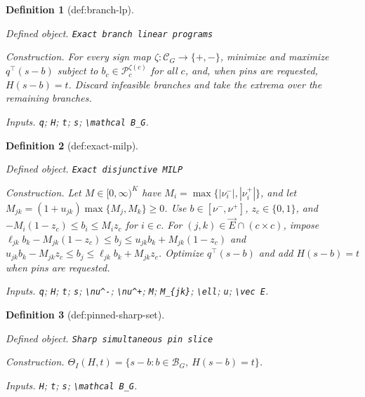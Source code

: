\documentclass{article}
\newtheorem{definition}{Definition}
\begin{document}
\begin{definition}[def:branch-lp]\label{def:branch-lp}
\par\smallskip\noindent\emph{Defined object.} \texttt{Exact branch linear programs}
\par\smallskip\noindent\emph{Construction.} For every sign map \(\zeta:\mathcal C_G\to\{+,-\}\), minimize and maximize \(q^\top(s-b)\) subject to \(b_c\in\mathcal P_c^{\zeta(c)}\) for all \(c\), and, when pins are requested, \(H(s-b)=t\). Discard infeasible branches and take the extrema over the remaining branches.
\par\smallskip\noindent\emph{Inputs.} \texttt{q}; \texttt{H}; \texttt{t}; \texttt{s}; \texttt{\textbackslash{}\allowbreak{}mathcal B\_\allowbreak{}G}.
\end{definition}

\begin{definition}[def:exact-milp]\label{def:exact-milp}
\par\smallskip\noindent\emph{Defined object.} \texttt{Exact disjunctive MILP}
\par\smallskip\noindent\emph{Construction.} Let \(M\in[0,\infty)^K\) have \(M_i=\max\{|\nu_i^-|,|\nu_i^+|\}\), and let \(M_{jk}=(1+u_{jk})\max\{M_j,M_k\}\ge0\). Use \(b\in[\nu^-,\nu^+]\), \(z_c\in\{0,1\}\), and \(-M_i(1-z_c)\le b_i\le M_i z_c\) for \(i\in c\). For \((j,k)\in\vec E\cap(c\times c)\), impose \(\ell_{jk}b_k-M_{jk}(1-z_c)\le b_j\le u_{jk}b_k+M_{jk}(1-z_c)\) and \(u_{jk}b_k-M_{jk}z_c\le b_j\le\ell_{jk}b_k+M_{jk}z_c\). Optimize \(q^\top(s-b)\) and add \(H(s-b)=t\) when pins are requested.
\par\smallskip\noindent\emph{Inputs.} \texttt{q}; \texttt{H}; \texttt{t}; \texttt{s}; \texttt{\textbackslash{}\allowbreak{}nu\textasciicircum{}-\allowbreak{}}; \texttt{\textbackslash{}\allowbreak{}nu\textasciicircum{}+\allowbreak{}}; \texttt{M}; \texttt{M\_\allowbreak{}\{jk\}\allowbreak{}}; \texttt{\textbackslash{}\allowbreak{}ell}; \texttt{u}; \texttt{\textbackslash{}\allowbreak{}vec E}.
\end{definition}

\begin{definition}[def:pinned-sharp-set]\label{def:pinned-sharp-set}
\par\smallskip\noindent\emph{Defined object.} \texttt{Sharp simultaneous pin slice}
\par\smallskip\noindent\emph{Construction.} \(\Theta_I(H,t)=\{s-b:b\in\mathcal B_G,\ H(s-b)=t\}\).
\par\smallskip\noindent\emph{Inputs.} \texttt{H}; \texttt{t}; \texttt{s}; \texttt{\textbackslash{}\allowbreak{}mathcal B\_\allowbreak{}G}.
\end{definition}
\end{document}
